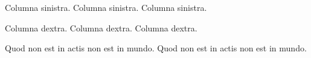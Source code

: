 \documentclass{book}
\begin{document}
\begin{pairs}
\begin{Leftside}
\beginnumbering
\pstart
Columna sinistra. Columna sinistra. Columna sinistra.
\pend
\endnumbering
\end{Leftside}

\begin{Rightside}
\beginnumbering
\pstart
Columna dextra. Columna dextra. Columna dextra.
\pend
\endnumbering
\end{Rightside}
\end{pairs}
\Columns

\begin{ledgroup}
\beginnumbering
\pstart
Quod non est in actis non est in mundo. Quod non est in actis non est in mundo.
\pend
\endnumbering
\end{ledgroup}
\end{document}
